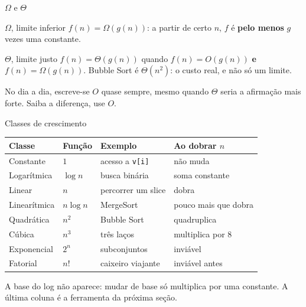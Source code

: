 \documentclass{beamer}
\begin{document}
\begin{frame}{$\Omega$ e $\Theta$}
	\begin{block}{$\Omega$, limite inferior}
		$f(n) = \Omega(g(n))$: a partir de certo $n$, $f$ é \textbf{pelo menos}
		$g$ vezes uma constante.
	\end{block}

	\begin{block}{$\Theta$, limite justo}
		$f(n) = \Theta(g(n))$ quando $f(n)=O(g(n))$ \textbf{e} $f(n)=\Omega(g(n))$.
		Bubble Sort é $\Theta(n^2)$: o custo real, e não só um limite.
	\end{block}

	\vspace{0.3cm}
	\footnotesize No dia a dia, escreve-se $O$ quase sempre, mesmo quando
	$\Theta$ seria a afirmação mais forte. Saiba a diferença, use $O$.
\end{frame}

\begin{frame}{Classes de crescimento}
	\begin{center}
		\small
		\begin{tabular}{@{}llll@{}}
			\toprule
			Classe       & Função     & Exemplo                & Ao dobrar $n$        \\
			\midrule
			Constante    & $1$        & acesso a \texttt{v[i]} & não muda             \\
			Logarítmica  & $\log n$   & busca binária          & soma constante       \\
			Linear       & $n$        & percorrer um slice     & dobra                \\
			Linearítmica & $n \log n$ & MergeSort              & pouco mais que dobra \\
			Quadrática   & $n^2$      & Bubble Sort            & quadruplica          \\
			Cúbica       & $n^3$      & três laços             & multiplica por 8     \\
			Exponencial  & $2^n$      & subconjuntos           & inviável             \\
			Fatorial     & $n!$       & caixeiro viajante      & inviável antes       \\
			\bottomrule
		\end{tabular}
	\end{center}
	\vspace{0.2cm}
	\footnotesize A base do log não aparece: mudar de base só multiplica por
	uma constante. A última coluna é a ferramenta da próxima seção.
\end{frame}
\end{document}
